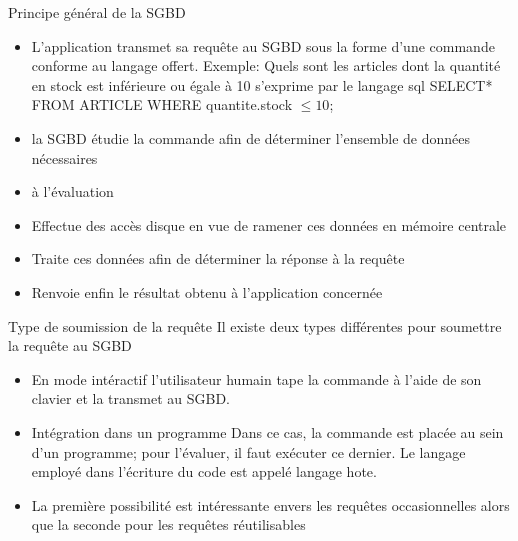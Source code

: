 \documentclass{beamer}
\begin{document}
\begin{frame}{Principe g\'en\'eral de la SGBD}
  \begin{itemize}
    \item L'application transmet sa requ\^ete au SGBD sous la forme d'une commande conforme au langage offert.
    \newline Exemple: Quels sont les articles dont la quantit\'e en stock est inf\'erieure ou \'egale \`a 10 s'exprime par le langage sql
   SELECT* FROM ARTICLE WHERE quantite.stock $\le10$;
    \item la SGBD \'etudie la commande afin de d\'eterminer l'ensemble de donn\'ees n\'ecessaires \item \`a l'\'evaluation
    \item Effectue des acc\`es disque en vue de ramener ces donn\'ees en m\'emoire centrale
    \item Traite ces donn\'ees afin de d\'eterminer la r\'eponse \`a la requ\^ete
    \item Renvoie enfin le r\'esultat obtenu \`a l'application concern\'ee
 \end{itemize}
\end{frame}
\begin{frame}{Type de soumission de la requ\^ete}
Il existe deux types diff\'erentes pour soumettre la requ\^ete au SGBD
\begin{itemize}
    \item En mode int\'eractif
    \newline l'utilisateur humain tape la commande \`a l'aide de son clavier et la transmet au SGBD.
    \item Int\'egration dans un programme
    \newline Dans ce cas, la commande est plac\'ee au sein d'un programme; pour l'\'evaluer, il faut ex\'ecuter ce dernier. Le langage employ\'e dans l'\'ecriture du code est appel\'e langage hote.
    \item La premi\`ere possibilit\'e est int\'eressante envers les requ\^etes occasionnelles alors que la seconde pour les requ\^etes r\'eutilisables
\end{itemize}
    

    
\end{frame}
\end{document}
